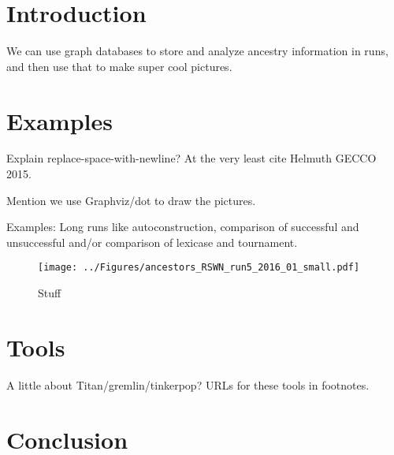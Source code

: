\documentclass{sig-alternate}
\begin{document}
%	
%	

\section{Introduction}
\label{sec:introduction}

We can use graph databases to store and analyze ancestry information in runs, and then use that to make super cool pictures.

\section{Examples}
\label{sec:examples}

Explain replace-space-with-newline? At the very least cite Helmuth GECCO 2015.

Mention we use Graphviz/dot to draw the pictures.

Examples: Long runs like autoconstruction, comparison of successful and unsuccessful and/or comparison of lexicase and tournament.

\begin{figure}
\centering
\texttt{[image: ../Figures/ancestors\_RSWN\_run5\_2016\_01\_small.pdf]}
\caption{Stuff}
\label{fig:autoconstructionAncestry}
\end{figure}

\section{Tools}
\label{sec:tools}

A little about Titan/gremlin/tinkerpop? URLs for these tools in footnotes.

\section{Conclusion}
\label{sec:conclusion}



\end{document}
